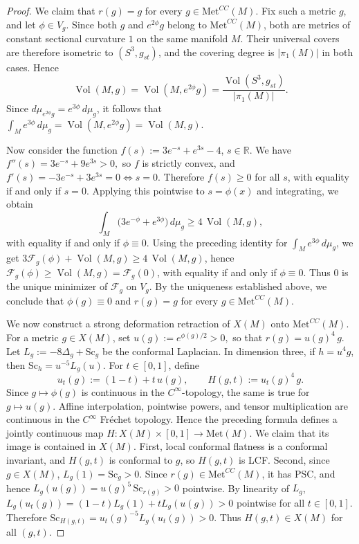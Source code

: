 \documentclass[12pt,oneside,a4paper]{article}
\theoremstyle{mytheorem}
\theoremstyle{remark}
\theoremstyle{definition}
\begin{document}
\begin{proof}
We claim that $r(g)=g$ for every $g\in \mathrm{Met}^{CC}(M)$. Fix such a metric
$g$, and let $\phi\in V_g$. Since both $g$ and $e^{2\phi}g$ belong to
$\mathrm{Met}^{CC}(M)$, both are metrics of constant sectional curvature
$1$ on the same manifold $M$. Their universal covers are therefore isometric to
$(S^3,g_{st})$, and the covering degree is $|\pi_1(M)|$ in both cases.
Hence
\[
\operatorname{Vol}(M,g)=\operatorname{Vol}(M,e^{2\phi}g)
=\frac{\operatorname{Vol}(S^3,g_{st})}{|\pi_1(M)|}.
\]
Since $d\mu_{e^{2\phi}g}=e^{3\phi}\,d\mu_g$, it follows that
\(\int_M e^{3\phi}\,d\mu_g=\operatorname{Vol}(M,e^{2\phi}g)=\operatorname{Vol}(M,g)\).

Now consider the function $f(s):=3e^{-s}+e^{3s}-4$, $s\in \mathbb R$. We have
\(
f''(s)=3e^{-s}+9e^{3s}>0,
\)
so $f$ is strictly convex, and
\(f'(s)=-3e^{-s}+3e^{3s}=0
\Longleftrightarrow s=0\).
Therefore $f(s)\ge 0$ for all $s$, with equality if and only if $s=0$.
Applying this pointwise to $s=\phi(x)$ and integrating, we obtain
\[
\int_M \bigl(3e^{-\phi}+e^{3\phi}\bigr)\,d\mu_g \ge 4\,\operatorname{Vol}(M,g),
\]
with equality if and only if $\phi\equiv 0$. Using the preceding identity for
$\int_M e^{3\phi}\,d\mu_g$, we get
\(3\mathcal F_g(\phi)+\operatorname{Vol}(M,g)\ge 4\,\operatorname{Vol}(M,g)\),
hence
\(\mathcal F_g(\phi)\ge \operatorname{Vol}(M,g)=\mathcal F_g(0)\),
with equality if and only if $\phi\equiv 0$. Thus $0$ is the unique minimizer of
$\mathcal F_g$ on $V_g$. By the uniqueness established above, we conclude that
$\phi(g)\equiv 0$ and $r(g)=g$ for every $g\in \mathrm{Met}^{CC}(M)$.

We now construct a strong deformation retraction of $X(M)$ onto
$\mathrm{Met}^{CC}(M)$. For a metric $g\in X(M)$, set
$u(g):=e^{\phi(g)/2}>0,$ so that $r(g)=u(g)^4\,g.$
Let
\(
L_g:=-8\Delta_g+\mathrm{Sc}_g
\)
be the conformal Laplacian. In dimension three, if $h=u^4g$, then
$\mathrm{Sc}_h=u^{-5}L_g(u)$.
For $t\in[0,1]$, define
\[
u_t(g):=(1-t)+t\,u(g),
\qquad
H(g,t):=u_t(g)^4\,g.
\]
Since $g\mapsto \phi(g)$ is continuous in the $C^\infty$-topology, the same is
true for $g\mapsto u(g)$. Affine interpolation, pointwise powers, and tensor
multiplication are continuous in the $C^\infty$ Fr\'echet topology. Hence the
preceding formula defines a jointly continuous map
\(H\colon X(M)\times[0,1]\to \mathrm{Met}(M)\).
We claim that its image is contained in $X(M)$.
First, local conformal flatness is a conformal invariant, and
$H(g,t)$ is conformal to $g$, so $H(g,t)$ is LCF.
Second, since $g\in X(M)$, $L_g(1)=\mathrm{Sc}_g>0.$
Since $r(g)\in \mathrm{Met}^{CC}(M)$, it has PSC, and hence
\(
L_g(u(g))=u(g)^5\,\mathrm{Sc}_{r(g)}>0
\)
pointwise. By linearity of $L_g$,
\(
L_g(u_t(g))=(1-t)L_g(1)+tL_g(u(g))>0
\)
pointwise for all $t\in[0,1]$. Therefore
\(\mathrm{Sc}_{H(g,t)}=u_t(g)^{-5}L_g(u_t(g))>0\).
Thus $H(g,t)\in X(M)$ for all $(g,t)$.


\end{proof}
\end{document}
